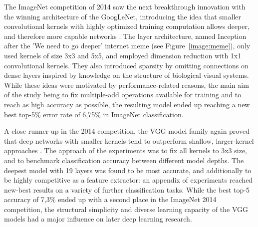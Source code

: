 \documentclass{article}
\begin{document}
The ImageNet competition of 2014 saw the next breakthrough innovation with the winning architecture of the GoogLeNet,
introducing the idea that smaller convolutional kernels with highly optimized training computation allows deeper,
and therefore more capable networks \cite{googlelenet}. The layer architecture, named Inception after the 'We 
need to go deeper' internet meme (see Figure~\ref{image:meme}), only used kernels of size 3x3 and 5x5, and
employed dimension reduction with 1x1 convolutional kernels. They also introduced sparsity by omitting connections on 
dense layers inspired by knowledge on the structure of biological visual systems. While these ideas were motivated
by performance-related reasons, the main aim of the study being to fix multiple-add operations available for training 
and to reach as high accuracy as possible, the resulting model ended up reaching a new best top-5\% error rate of 6,75\%
in ImageNet classification.

A close runner-up in the 2014 competition, the VGG model family again proved that deep networks 
with smaller kernels tend to outperform shallow, larger-kernel approaches \cite{vgg}. The approach 
of the experiments was to fix all kernels to 3x3 size, and to benchmark classification accuracy between 
different model depths. The deepest model with 19 layers was found to be most accurate, and additionally 
to be highly competitive as a feature extractor: an appendix of experiments reached new-best results on a variety of 
further classification tasks. While the 
best top-5 accuracy of 7,3\% ended up with a second place in the ImageNet 2014 competition, the structural simplicity
and diverse learning capacity of the VGG models had a major influence on later deep learning research.
\end{document}
